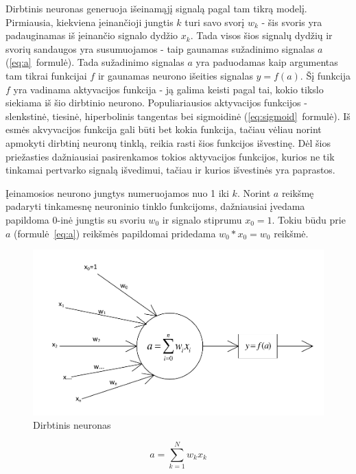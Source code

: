 \documentclass{VUMIFPSbakalaurinis}
\begin{document}
Dirbtinis neuronas generuoja išeinamąjį signalą pagal tam tikrą modelį.
Pirmiausia, kiekviena įeinančioji jungtis $k$ turi savo svorį $w_k$ - šis svoris yra padauginamas iš įeinančio signalo dydžio $x_k$.
Tada visos šios signalų dydžių ir svorių sandaugos yra susumuojamos - taip gaunamas sužadinimo signalas $a$ (\ref{eq:a}~formulė).
Tada sužadinimo signalas $a$ yra paduodamas kaip argumentas tam tikrai funkcijai $f$ ir gaunamas neurono išeities signalas $y = f(a)$.
Šį funkcija $f$ yra vadinama aktyvacijos funkcija - ją galima keisti pagal tai, kokio tikslo siekiama iš šio dirbtinio neurono.
Populiariausios aktyvacijos funkcijos - slenkstinė, tiesinė, hiperbolinis tangentas bei sigmoidinė (\ref{eq:sigmoid}~formulė).
Iš esmės akvyvacijos funkcija gali būti bet kokia funkcija, tačiau vėliau norint apmokyti dirbtinį neuronų tinklą, reikia rasti šios funkcijos išvestinę.
Dėl šios priežasties dažniausiai pasirenkamos tokios aktyvacijos funkcijos, kurios ne tik tinkamai pertvarko signalą išvedimui, tačiau ir kurios išvestinės yra paprastos.

Įeinamosios neurono jungtys numeruojamos nuo 1 iki $k$.
Norint $a$ reikšmę padaryti tinkamesnę neuroninio tinklo funkcijoms, dažniausiai įvedama papildoma $0$-inė jungtis su svoriu $w_0$ ir signalo stiprumu $x_0 = 1$.
Tokiu būdu prie $a$ (formulė~\ref{eq:a}) reikšmės papildomai pridedama $w_0 * x_0 = w_0$ reikšmė.

\begin{figure}
	\includegraphics[scale=0.75]{diagrams/1_neuron}
	\caption{Dirbtinis neuronas}
	\label{fig:neuron}
\end{figure}

\begin{equation} \label{eq:a}
a = \sum_{k=1}^N w_kx_k
\end{equation}
\end{document}
